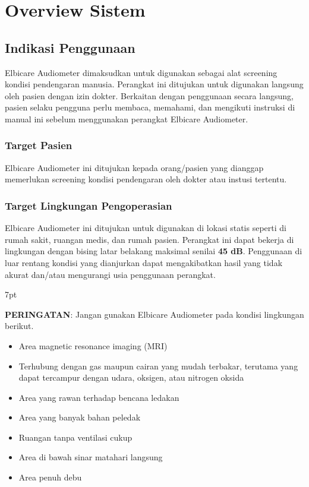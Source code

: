 \documentclass[11pt,a4paper,twoside,draft,onecolumn]{book}
\newenvironment{formalred}{%
	\def\FrameCommand{%
		\hspace{1pt}%
		{\color{red}\vrule width 2pt}%
		{\color{formalshade}\vrule width 4pt}%
		\colorbox{formalshade}%
	}%
	\MakeFramed{\advance\hsize-\width\FrameRestore}%
	\noindent\hspace{-4.55pt}%
	\begin{adjustwidth}{}{7pt}%
		\vspace{2pt}\vspace{2pt}%
	}
	{%
		\vspace{2pt}\end{adjustwidth}\endMakeFramed%
}
\begin{document}
	\newpage
	
	\chapter{Overview Sistem}
		\section{Indikasi Penggunaan}
		Elbicare Audiometer dimaksudkan untuk digunakan sebagai alat screening kondisi pendengaran manusia. Perangkat ini ditujukan untuk digunakan langsung oleh pasien dengan izin dokter. Berkaitan dengan penggunaan secara langsung, pasien selaku pengguna perlu membaca, memahami, dan mengikuti instruksi di manual ini sebelum menggunakan perangkat Elbicare Audiometer.
			\subsection{Target Pasien}
			Elbicare Audiometer ini ditujukan kepada orang/pasien yang dianggap memerlukan screening kondisi pendengaran oleh dokter atau instusi tertentu.
			\subsection{Target Lingkungan Pengoperasian}
			Elbicare Audiometer ini ditujukan untuk digunakan di lokasi statis seperti di rumah sakit, ruangan medis, dan rumah pasien. Perangkat ini dapat bekerja di lingkungan dengan bising latar belakang maksimal senilai \textbf{45 dB}. Penggunaan di luar rentang kondisi yang dianjurkan dapat mengakibatkan hasil yang tidak akurat dan/atau mengurangi usia penggunaan perangkat.
			
			\begin{formalred}
				\raisebox{0.125ex}{\resizebox{!}{2ex}{\danger}} \textbf{PERINGATAN}: 
				Jangan gunakan Elbicare Audiometer pada kondisi lingkungan berikut.
				\begin{itemize}
					\item Area magnetic resonance imaging (MRI)
					\item Terhubung dengan gas maupun cairan yang mudah terbakar, terutama yang dapat tercampur dengan udara, oksigen, atau nitrogen oksida
					\item Area yang rawan terhadap bencana ledakan
					\item Area yang banyak bahan peledak
					\item Ruangan tanpa ventilasi cukup
					\item Area di bawah sinar matahari langsung
					\item Area penuh debu
				\end{itemize}
				
			\end{formalred}
			
\end{document}
